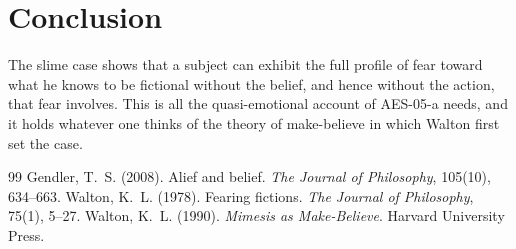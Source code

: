 \documentclass{situationist-preprint}
\begin{document}
\section{Conclusion}

The slime case shows that a subject can exhibit the full profile of fear toward what he knows to be fictional without the belief, and hence without the action, that fear involves. This is all the quasi-emotional account of AES-05-a needs, and it holds whatever one thinks of the theory of make-believe in which Walton first set the case.

\begin{thebibliography}{99}\small
{} Gendler, T.~S. (2008). Alief and belief. \emph{The Journal of Philosophy}, 105(10), 634--663.
 Walton, K.~L. (1978). Fearing fictions. \emph{The Journal of Philosophy}, 75(1), 5--27.
 Walton, K.~L. (1990). \emph{Mimesis as Make-Believe}. Harvard University Press.
\end{thebibliography}
\end{document}

